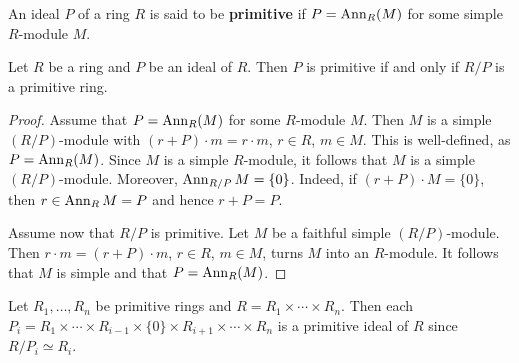\lecture{}

\begin{definition}
An ideal $P$ of a ring $R$ is said to be \textbf{primitive} if $P=\operatorname{Ann}_R(M)$
for some simple $R$-module $M$. 
\end{definition}

\begin{lemma}
	\label{lemma:primitivo}
	Let $R$ be a ring and $P$ be an ideal of $R$. Then $P$ is primitive if and only if 
	$R/P$ is a primitive ring.
\end{lemma}

\begin{proof}
	Assume that $P=\operatorname{Ann}_R(M)$ for some $R$-module $M$. Then $M$ is a simple 
	$(R/P)$-module with $(r+P)\cdot m=r\cdot m$, $r\in R$, $m\in M$. This is well-defined, as 
	$P=\operatorname{Ann}_R(M)$. Since $M$ is a simple $R$-module, it follows that $M$ is 
	a simple $(R/P)$-module. Moreover, $\operatorname{Ann}_{R/P}M=\{0\}$. Indeed, if 
	$(r+P)\cdot M=\{0\}$, then $r\in\operatorname{Ann}_RM=P$ and hence $r+P=P$.

	Assume now that $R/P$ is primitive. Let $M$ be a faithful simple $(R/P)$-module. 
	Then $r\cdot m=(r+P)\cdot m$, $r\in R$,
	$m\in M$, turns $M$ into an $R$-module. It follows that $M$ is simple and that $P=\operatorname{Ann}_R(M)$. 
\end{proof}



\begin{example}
	Let $R_1,\dots,R_n$ be primitive rings and $R=R_1\times\cdots\times
	R_n$. Then each $P_i=R_1\times\cdots\times R_{i-1}\times\{0\}\times
	R_{i+1}\times\cdots\times R_n$ is a primitive ideal of $R$ since 
	$R/P_i\simeq R_i$.
\end{example}

%

